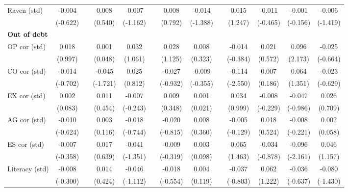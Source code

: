 \begin{table}[htbp]
{\begin{tabular}{lcccccccccccc}
    Raven (std) & -0.004 &       & 0.008 & -0.007 &       & 0.008 & -0.014 &       & 0.015 & -0.011 & -0.001 & -0.006 \\
          & (-0.622) &       & (0.540) & (-1.162) &       & (0.792) & (-1.388) &       & (1.247) & (-0.465) & (-0.156) & (-1.419) \\
    \midrule
    \textbf{Out of debt} &       &       &       &       &       &       &       &       &       &       &       &  \\
    OP cor (std) & 0.018 &       & 0.001 & 0.032 &       & 0.028 & 0.008 &       & -0.014 & 0.021 & \cellcolor[rgb]{ 1,  1,  0}0.096 & -0.025 \\
          & (0.997) &       & (0.048) & (1.061) &       & (1.125) & (0.323) &       & (-0.384) & (0.572) & (2.173) & (-0.664) \\
    CO cor (std) & -0.014 &       & \cellcolor[rgb]{ 1,  1,  0}-0.045 & 0.025 &       & -0.027 & -0.009 &       & \cellcolor[rgb]{ 1,  1,  0}-0.114 & 0.007 & 0.064 & -0.023 \\
          & (-0.702) &       & (-1.721) & (0.812) &       & (-0.932) & (-0.355) &       & (-2.550) & (0.186) & (1.351) & (-0.629) \\
    EX cor (std) & 0.002 &       & 0.011 & -0.007 &       & 0.009 & 0.001 &       & 0.034 & -0.008 & -0.047 & 0.026 \\
          & (0.083) &       & (0.454) & (-0.243) &       & (0.348) & (0.021) &       & (0.999) & (-0.229) & (-0.986) & (0.709) \\
    AG cor (std) & -0.010 &       & 0.003 & -0.018 &       & -0.020 & 0.008 &       & -0.005 & 0.018 & -0.008 & 0.002 \\
          & (-0.624) &       & (0.116) & (-0.744) &       & (-0.815) & (0.360) &       & (-0.129) & (0.524) & (-0.221) & (0.058) \\
    ES cor (std) & -0.007 &       & 0.017 & -0.041 &       & -0.009 & 0.003 &       & 0.065 & -0.034 & \cellcolor[rgb]{ 1,  1,  0}-0.096 & 0.046 \\
          & (-0.358) &       & (0.639) & (-1.351) &       & (-0.319) & (0.098) &       & (1.463) & (-0.878) & (-2.161) & (1.157) \\
    Literacy (std) & -0.008 &       & 0.014 & -0.046 &       & -0.018 & 0.004 &       & -0.037 & 0.062 & -0.036 & -0.080 \\
          & (-0.300) &       & (0.424) & (-1.112) &       & (-0.554) & (0.119) &       & (-0.803) & (1.222) & (-0.637) & (-1.430) \\

\end{tabular}}
\end{table}
